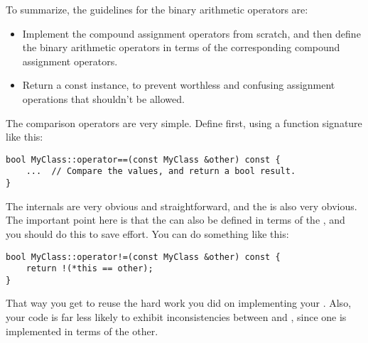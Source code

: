 To summarize, the guidelines for the binary arithmetic operators are:

\begin{itemize}
\tightlist
    \item Implement the compound assignment operators from scratch, and then define the binary arithmetic operators in terms of the corresponding compound assignment operators.
    \item Return a const instance, to prevent worthless and confusing assignment operations that shouldn't be allowed.
\end{itemize}


The comparison operators are very simple. Define \btic{==} first, using a function signature like this:

\begin{verbatim}
bool MyClass::operator==(const MyClass &other) const {
    ...  // Compare the values, and return a bool result.
}
\end{verbatim}

The internals are very obvious and straightforward, and the  is also very obvious.
The important point here is that the can also be defined in terms of the , and you should do this to save effort. You can do something like this:

\begin{verbatim}
bool MyClass::operator!=(const MyClass &other) const {
    return !(*this == other);
}
\end{verbatim}

That way you get to reuse the hard work you did on implementing your . Also, your code is far less likely to exhibit inconsistencies between \btic{==} and \btic{!=}, since one is implemented in terms of the other.
